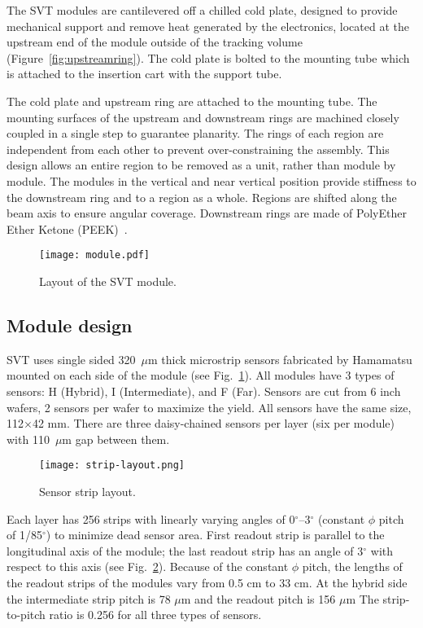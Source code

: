  The SVT modules are cantilevered off a chilled cold plate, designed to provide mechanical support and remove heat generated by the electronics, located at the upstream end of the module outside of the tracking volume (Figure~\ref{fig:upstreamring}). The cold plate is bolted to the mounting tube which is attached to the insertion cart with the support tube. 
 
The cold plate and upstream ring are attached to the mounting tube. The mounting surfaces of the upstream and downstream rings are machined closely coupled in a single step to guarantee planarity. The rings of each region are independent from each other to prevent over-constraining the assembly. This design allows an entire region to be removed as a unit, rather than module by module. The modules in the vertical and near vertical position provide stiffness to the downstream ring and to a region as a whole. Regions are shifted along the beam axis to ensure angular coverage. Downstream rings are made of PolyEther Ether Ketone (PEEK)~\cite{NIMVCC}. 

\begin{figure}[hbt] 
\centering 
\texttt{[image: module.pdf]}
\caption{Layout of the SVT module.}
\label{fig:module}
\end{figure}

\subsection{Module design}

SVT uses single sided 320~$\mu$m thick microstrip sensors fabricated by Hamamatsu mounted on each side of the module (see Fig.~\ref{fig:module}). All modules have 3 types of sensors: H (Hybrid), I (Intermediate), and F (Far). Sensors are cut from 6 inch wafers, 2 sensors per wafer to maximize the yield. All sensors have the same size, 112$\times$42 mm. There are three daisy-chained sensors per layer (six per module) with 110~$\mu$m gap between them. 

\begin{figure}[hbt] 
\centering 
\texttt{[image: strip-layout.png]}
\caption{Sensor strip layout.}
\label{fig:strip-layout}
\end{figure}

Each layer has 256 strips with linearly varying angles of 0$^\circ$--3$^\circ$ (constant $\phi$ pitch of 1/85$^\circ$) to minimize dead sensor area. First readout strip is parallel to the longitudinal axis of the module; the last readout strip has an angle of 3$^\circ$ with respect to this axis (see Fig.~\ref{fig:strip-layout}). Because of the constant $\phi$ pitch, the lengths of the readout strips of the modules vary from 0.5 cm to 33 cm. At the hybrid side the intermediate strip pitch is 78 $\mu$m and the readout pitch is 156 $\mu$m The strip-to-pitch ratio is 0.256 for all three types of sensors.

